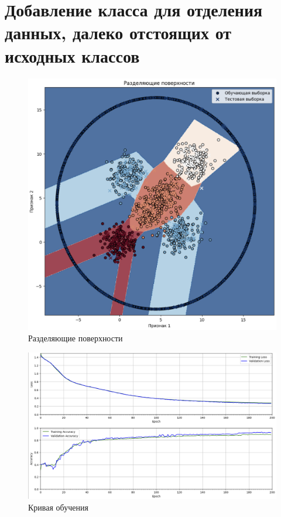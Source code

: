 \clearpage

\section{Добавление класса для отделения данных, далеко отстоящих от исходных классов}

\begin{figure}
	\begin{center}
		\includegraphics[width=\textwidth]{images/11.png}
	\end{center}
	\caption{Разделяющие поверхности}
	\label{img:11}
\end{figure}

\begin{figure}
	\begin{center}
		\includegraphics[width=\textwidth]{images/12.png}
	\end{center}
	\caption{Кривая обучения}
	\label{img:12}
\end{figure}

